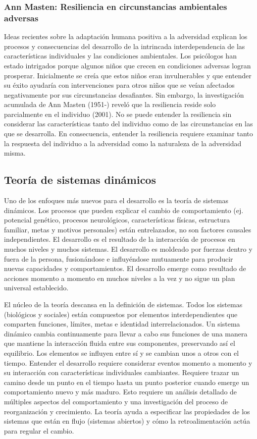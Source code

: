 \documentclass[11pt,letterpaper]{report}
\begin{document}
\subsubsection{Ann Masten: Resiliencia en circunstancias ambientales adversas}
Ideas recientes sobre la adaptación humana positiva a la adversidad explican
los procesos y consecuencias del desarrollo de la intrincada interdependencia
de las características individuales y las condiciones ambientales. Los
psicólogos han estado intrigados porque algunos niños que crecen en condiciones
adversas logran prosperar. Inicialmente se creía que estos niños eran
invulnerables y que entender su éxito ayudaría con intervenciones para otros
niños que se veían afectados negativamente por sus circunstancias desafiantes.
Sin embargo, la investigación acumulada de Ann Masten (1951-) reveló que la
resiliencia reside solo parcialmente en el individuo (2001). No se puede
entender la resiliencia sin considerar las características tanto del individuo
como de las circunstancias en las que se desarrolla. En consecuencia, entender
la resiliencia requiere examinar tanto la respuesta del individuo a la
adversidad como la naturaleza de la adversidad misma. \cite{Feldman3}

\subsection{Teoría de sistemas dinámicos}
Uno de los enfoques más nuevos para el desarrollo es la teoría de sistemas
dinámicos. Los procesos que pueden explicar el cambio de comportamiento (ej.
potencial genético, procesos neurológicos, características físicas,
estructura familiar, metas y motivos personales) están entrelazados, no son
factores causales independientes. El desarrollo es el resultado de la
interacción de procesos en muchos niveles y muchos sistemas. El desarrollo es
moldeado por fuerzas dentro y fuera de la persona, fusionándose e influyéndose
mutuamente para producir nuevas capacidades y comportamientos. El desarrollo
emerge como resultado de acciones momento a momento en muchos niveles a la vez
y no sigue un plan universal establecido. \cite{Newman2020}

El núcleo de la teoría descansa en la definición de sistemas. Todos los
sistemas (biológicos y sociales) están compuestos por elementos
interdependientes que comparten funciones, límites, metas e identidad
interrelacionados. Un sistema dinámico cambia continuamente para llevar a cabo
sus funciones de una manera que mantiene la interacción fluida entre sus
componentes, preservando así el equilibrio. Los elementos se influyen entre sí
y se cambian unos a otros con el tiempo. Entender el desarrollo requiere
considerar eventos momento a momento y su interacción con características
individuales cambiantes. Requiere trazar un camino desde un punto en el tiempo
hasta un punto posterior cuando emerge un comportamiento nuevo y más maduro.
Esto requiere un análisis detallado de múltiples aspectos del comportamiento y
una investigación del proceso de reorganización y crecimiento. La teoría ayuda
a especificar las propiedades de los sistemas que están en flujo (sistemas
abiertos) y cómo la retroalimentación actúa para regular el cambio.
\cite{Feldman3}
\end{document}
